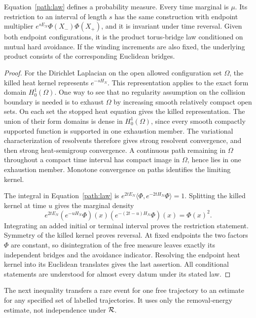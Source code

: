 \begin{lemma}\label{path:slab}
Equation~\eqref{path:law} defines a probability measure.  Every time
marginal is $\mu$.  Its restriction to an interval of length $s$ has
the same construction with endpoint multiplier
$e^{sE_N}\Phi(X_-)\Phi(X_+)$, and it is invariant under time reversal.
Given both endpoint configurations, it is the product torus-bridge law
conditioned on mutual hard avoidance.  If the winding increments are
also fixed, the underlying product consists of the corresponding
Euclidean bridges.
\end{lemma}

\begin{proof}
For the Dirichlet Laplacian on the open allowed configuration set
$\Omega$, the killed heat kernel represents $e^{-sH_N}$.
This representation applies to the exact form domain $H^1_0(\Omega)$.
One way to see that no regularity assumption on the collision boundary
is needed is to exhaust $\Omega$ by increasing smooth relatively
compact open sets.  On each set the stopped heat equation gives the
killed representation.  The union of their form domains is dense in
$H^1_0(\Omega)$, since every smooth compactly supported function is
supported in one exhaustion member.  The variational characterization
of resolvents therefore gives strong resolvent convergence, and then
strong heat-semigroup convergence.  A continuous path remaining in
$\Omega$ throughout a compact time interval has compact image in
$\Omega$, hence lies in one exhaustion member.  Monotone convergence
on paths identifies the limiting kernel.

The integral in Equation~\eqref{path:law} is
$e^{2tE_N}\langle\Phi,e^{-2tH_N}\Phi\rangle=1$.
Splitting the killed kernel at time $u$ gives the marginal density
\[
 e^{2tE_N}(e^{-uH_N}\Phi)(x)
                  (e^{-(2t-u)H_N}\Phi)(x)=\Phi(x)^2.
\]
Integrating an added initial or terminal interval proves the restriction
statement.  Symmetry of the killed kernel proves reversal.  At fixed
endpoints the two factors $\Phi$ are constant, so disintegration of
the free measure leaves exactly its independent bridges and the
avoidance indicator.  Resolving the endpoint heat kernel into its
Euclidean translates gives the last assertion.  All conditional
statements are understood for almost every datum under its stated law.
\end{proof}

The next inequality transfers a rare event for one free trajectory to
an estimate for any specified set of labelled trajectories.  It uses
only the removal-energy estimate, not independence under $\mathcal R$.

